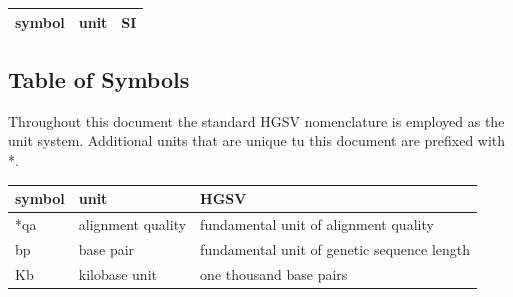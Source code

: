 \documentclass[12pt]{article}
\begin{document}
\renewcommand{\arraystretch}{1.2}
\begin{center}
  \begin{tabular}{l l l} 
    \toprule		
    \textbf{symbol} & \textbf{unit} & \textbf{SI}\\
    \midrule 
    
    \bottomrule
  \end{tabular}
\end{center}





\subsection{Table of Symbols}

Throughout this document the standard HGSV nomenclature is employed as the unit system.
Additional units that are unique tu this document are prefixed with *.

\begin{center}
  \begin{tabular}{l l l} 
    \toprule		
    \textbf{symbol} & \textbf{unit} & \textbf{HGSV}\\
    \midrule 
    *qa & alignment quality & fundamental unit of alignment quality
    \\
    bp & base pair & fundamental unit of genetic sequence length
    \\
    Kb & kilobase unit & one thousand base pairs
    \\
    \bottomrule
  \end{tabular}
  \end{center}
\end{document}
